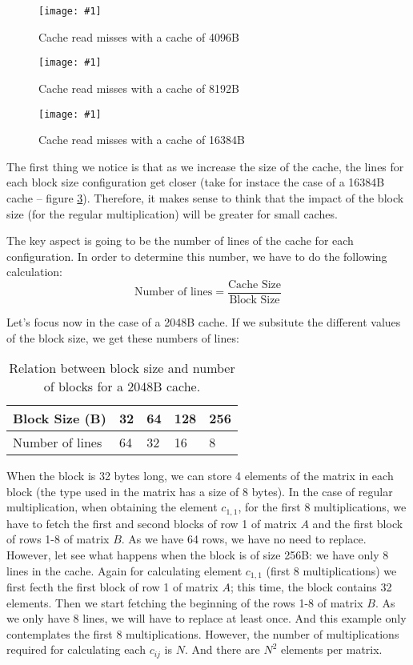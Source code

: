 \documentclass{article}
\newcommand{\myFigure}[4]{%
    \begin{figure}[!ht]
        \texttt{[image: \#1]}
        \centering
        \caption{#2}
        \label{#3}
    \end{figure}
}
\begin{document}
\pagebreak

\myFigure{../material_P3/protect_out4/BlockSize_4096/cache_lectura.png}{Cache read misses with a cache of 4096B}{block_4096_lec}{0.52}

\myFigure{../material_P3/protect_out4/BlockSize_8192/cache_lectura.png}{Cache read misses with a cache of 8192B}{block_8192B_lec}{0.52}

\pagebreak

\myFigure{../material_P3/protect_out4/BlockSize_16384/cache_lectura.png}{Cache read misses with a cache of 16384B}{block_16384B_lec}{0.52}


The first thing we notice is that as we increase the size of the cache, the lines for each block size configuration get closer (take for instace the case of a 16384B cache -- figure \ref{block_16384B_lec}).  Therefore, it makes sense to think that the impact of the block size (for the regular multiplication) will be greater for small caches.

The key aspect is going to be the number of lines of the cache for each configuration. In order to determine this number, we have to do the following calculation: 
\[
\text{Number of lines} = \frac{\text{Cache Size}}{\text{Block Size}}
\]

Let's focus now in the case of a 2048B cache. If we subsitute the different values of the block size, we get these numbers of lines:

{
\begin{table}[!ht]
    \centering
    \begin{tabular}{lllll}
    \hline
    \multicolumn{1}{|l|}{Block Size (B)}      & \multicolumn{1}{l|}{32} & \multicolumn{1}{l|}{64} & \multicolumn{1}{l|}{128} & \multicolumn{1}{l|}{256} \\ \hline
    \multicolumn{1}{|l|}{Number of lines} & \multicolumn{1}{l|}{64} & \multicolumn{1}{l|}{32} & \multicolumn{1}{l|}{16}  & \multicolumn{1}{l|}{8}   \\ \hline                    
    \end{tabular}
    \caption{\label{tab:table-name}Relation between block size and number of blocks for a 2048B cache.}
\end{table}
}


When the block is 32 bytes long, we can store 4 elements of the matrix in each block (the type used in the matrix has a size of 8 bytes). In the case of regular multiplication, when obtaining the element $c_{1,1}$, for the first 8 multiplications, we have to fetch the first and second blocks of row 1 of matrix $A$ and the first block of rows 1-8 of matrix $B$. As we have 64 rows, we have no need to replace. However, let see what happens when the block is of size 256B: we have only 8 lines in the cache. Again for calculating element $c_{1,1}$ (first 8 multiplications) we first fecth the first block of row 1 of matrix $A$; this time, the block contains 32 elements. Then we start fetching the beginning of the rows 1-8 of matrix $B$. As we only have 8 lines, we will have to replace at least once. And this example only contemplates the first 8 multiplications. However, the number of multiplications required for calculating each $c_{ij}$ is $N$. And there are $N^2$ elements per matrix.
\end{document}
